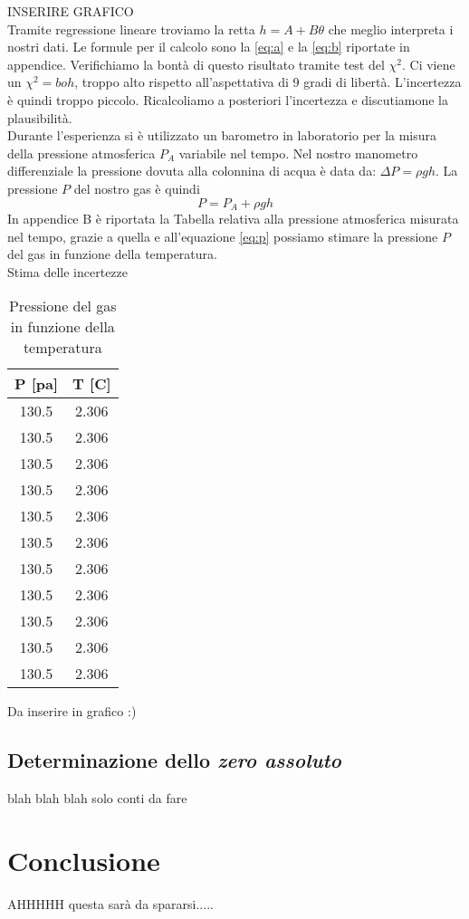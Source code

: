 INSERIRE GRAFICO\\
\newline
Tramite regressione lineare troviamo la retta $h = A+B\theta$ che meglio interpreta i nostri dati. Le formule per il calcolo sono la \eqref{eq:a} e la \eqref{eq:b} riportate in appendice.
Verifichiamo la bontà di questo risultato tramite test del $\chi^2$. Ci viene un $\chi^2=boh$, troppo alto rispetto all'aspettativa di 9 gradi di libertà. L'incertezza è quindi troppo piccolo. Ricalcoliamo a posteriori l'incertezza e discutiamone la plausibilità.\\
\newline
Durante l'esperienza si è utilizzato un barometro in laboratorio per la misura della pressione atmosferica $P_A$ variabile nel tempo. Nel nostro manometro differenziale la pressione dovuta alla colonnina di acqua è data da: $\Delta P = \rho gh$. La pressione $P$ del nostro gas è quindi 
\begin{equation}
\label{eq:p}
P = P_A + \rho gh
\end{equation}
In appendice B è riportata la Tabella relativa alla pressione atmosferica misurata nel tempo, grazie a quella e all'equazione \eqref{eq:p} possiamo stimare la pressione $P$ del gas in funzione della temperatura.\\
Stima delle incertezze\\
\begin{table}[H]
	\centering
	\begin{tabular}{|c|c|} \hline
		\textbf{P {[pa]} } & \textbf{T {[\degree C]} }  \\ \hline
		130.5 & 2.306  \\ \hline
		130.5 & 2.306  \\ \hline
		130.5 & 2.306  \\ \hline
		130.5 & 2.306  \\ \hline
		130.5 & 2.306  \\ \hline
		130.5 & 2.306  \\ \hline
		130.5 & 2.306  \\ \hline
		130.5 & 2.306  \\ \hline
		130.5 & 2.306  \\ \hline
		130.5 & 2.306  \\ \hline
		130.5 & 2.306  \\ \hline
	\end{tabular}
	\caption{Pressione del gas in funzione della temperatura}
\end{table}

Da inserire in grafico :)

\subsection{Determinazione dello \emph{zero assoluto}}
blah blah blah solo conti da fare 

\section{Conclusione}
AHHHHH questa sarà da spararsi.....